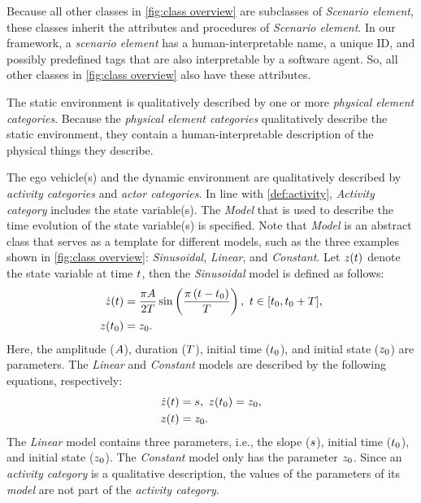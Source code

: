 \cstartb Because all other classes in \cref{fig:class overview} are subclasses of \textit{Scenario element}, these classes inherit the attributes and procedures of \textit{Scenario element}. In our framework, a \textit{scenario element} has a human-interpretable name, a unique ID, and possibly predefined tags that are also interpretable by a software agent. So, all other classes in \cref{fig:class overview} also have these attributes. \cendb

The static environment is qualitatively described by \cstarte one or more \textit{physical element categories}. \cende
Because the \cstarte\textit{physical element categories} \cende qualitatively describe the static environment, they contain a human-interpretable description of the \cstartc physical things they describe\cendc.

The ego vehicle\cstartd(s) \cendd and the dynamic environment are qualitatively described by \textit{activity categories} and \textit{actor categories}. 
In line with \cref{def:activity}, \textit{Activity category} includes the state variable(s).
The \textit{Model} that is used to describe the time evolution of the state variable(s) is specified. 
\cstarte Note that \textit{Model} is an abstract class that serves as a template for different models, such as the three examples shown in \cref{fig:class overview}: \textit{Sinusoidal}, \textit{Linear}, and \textit{Constant}. 
Let $z(t)$ denote the state variable at time $t$, then the \textit{Sinusoidal} model is defined as follows:
\begin{align}
	\statedot(\time) &= \frac{\pi \amplitude}{2\duration} \sin \left( \frac{\pi \left( \time - \timeinit\right)}{\duration} \right),\ \time \in [\timeinit, \timeinit+\duration], \label{eq:sinusoidala} \\
	\state(\timeinit) &= \stateinit. \label{eq:sinusoidalb}
\end{align}
Here, the amplitude ($A$), duration ($T$), initial time ($t_{0}$), and initial state ($z_{0}$) are parameters. 
The \textit{Linear} and \textit{Constant} models are described by the following equations, respectively:
\begin{align}
	\statedot(\time) &= \slope,\ \state(\timeinit) = \stateinit, \label{eq:linear} \\
	\state(\time) &= \stateinit. \label{eq:constant}
\end{align}
The \textit{Linear} model contains three parameters, i.e., the slope ($s$), initial time ($t_{0}$), and initial state ($z_{0}$). The \textit{Constant} model only has the parameter $z_{0}$.
Since an \textit{activity category} is a qualitative description, the values of the parameters of its \textit{model} are not part of the \textit{activity category}. \cende

